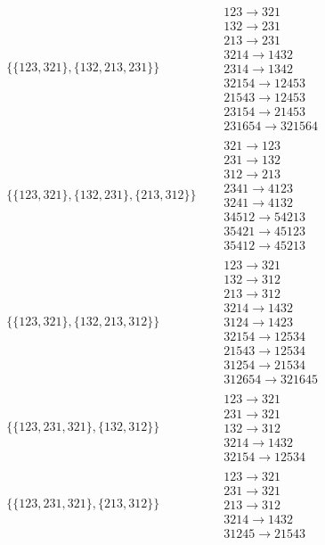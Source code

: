 \begin{tiny}
\begin{align}
\begin{matrix}
\end{matrix}
\\
\{\{123, 321\}, \{132, 213, 231\}\}
\quad
&
\begin{matrix}
123 \to 321\\132 \to 231\\213 \to 231\\3214 \to 1432\\2314 \to 1342\\32154 \to 12453\\21543 \to 12453\\23154 \to 21453\\231654 \to 321564
\end{matrix}
\\
\{\{123, 321\}, \{132, 231\}, \{213, 312\}\}
\quad
&
\begin{matrix}
321 \to 123\\231 \to 132\\312 \to 213\\2341 \to 4123\\3241 \to 4132\\34512 \to 54213\\35421 \to 45123\\35412 \to 45213
\end{matrix}
\\
\{\{123, 321\}, \{132, 213, 312\}\}
\quad
&
\begin{matrix}
123 \to 321\\132 \to 312\\213 \to 312\\3214 \to 1432\\3124 \to 1423\\32154 \to 12534\\21543 \to 12534\\31254 \to 21534\\312654 \to 321645
\end{matrix}
\\
\{\{123, 231, 321\}, \{132, 312\}\}
\quad
&
\begin{matrix}
123 \to 321\\231 \to 321\\132 \to 312\\3214 \to 1432\\32154 \to 12534
\end{matrix}
\\
\{\{123, 231, 321\}, \{213, 312\}\}
\quad
&
\begin{matrix}
123 \to 321\\231 \to 321\\213 \to 312\\3214 \to 1432\\31245 \to 21543

\end{matrix}
\end{align}
\end{tiny}
